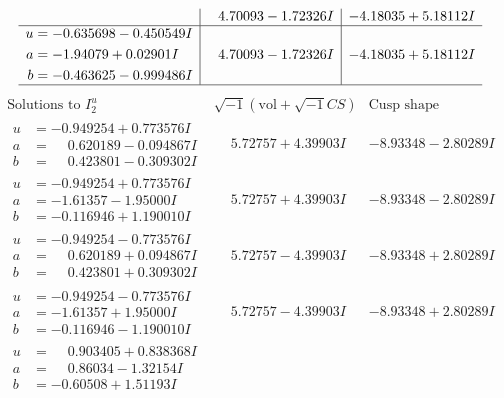 \documentclass[1p]{elsarticle_modified}
\theoremstyle{definition}
\newcommand{\I}{\sqrt{-1}}
\begin{document}
$$\begin{array}{c|c|c}
 & \phantom{-}4.70093 - 1.72326 I & -4.18035 + 5.18112 I \\ \hline\begin{aligned}
u &= -0.635698 - 0.450549 I \\
a &= -1.94079 + 0.02901 I \\
b &= -0.463625 - 0.999486 I\end{aligned}
 & \phantom{-}4.70093 - 1.72326 I & -4.18035 + 5.18112 I\\
 \hline 
 \end{array}$$\newpage$$\begin{array}{c|c|c}  
\text{Solutions to }I^u_{2}& \I (\text{vol} + \sqrt{-1}CS) & \text{Cusp shape}\\
 \hline 
\begin{aligned}
u &= -0.949254 + 0.773576 I \\
a &= \phantom{-}0.620189 - 0.094867 I \\
b &= \phantom{-}0.423801 - 0.309302 I\end{aligned}
 & \phantom{-}5.72757 + 4.39903 I & -8.93348 - 2.80289 I \\ \hline\begin{aligned}
u &= -0.949254 + 0.773576 I \\
a &= -1.61357 - 1.95000 I \\
b &= -0.116946 + 1.190010 I\end{aligned}
 & \phantom{-}5.72757 + 4.39903 I & -8.93348 - 2.80289 I \\ \hline\begin{aligned}
u &= -0.949254 - 0.773576 I \\
a &= \phantom{-}0.620189 + 0.094867 I \\
b &= \phantom{-}0.423801 + 0.309302 I\end{aligned}
 & \phantom{-}5.72757 - 4.39903 I & -8.93348 + 2.80289 I \\ \hline\begin{aligned}
u &= -0.949254 - 0.773576 I \\
a &= -1.61357 + 1.95000 I \\
b &= -0.116946 - 1.190010 I\end{aligned}
 & \phantom{-}5.72757 - 4.39903 I & -8.93348 + 2.80289 I \\ \hline\begin{aligned}
u &= \phantom{-}0.903405 + 0.838368 I \\
a &= \phantom{-}0.86034 - 1.32154 I \\
b &= -0.60508 + 1.51193 I\end{aligned}

\end{array}$$
\end{document}
